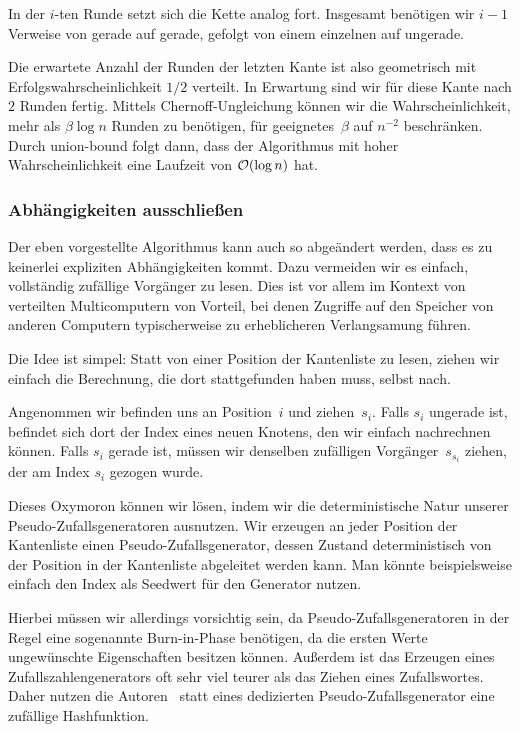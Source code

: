In der $i$-ten Runde setzt sich die Kette analog fort.
Insgesamt benötigen wir $i-1$ Verweise von gerade auf gerade, gefolgt von einem einzelnen auf ungerade.

Die erwartete Anzahl der Runden der letzten Kante ist also geometrisch mit Erfolgswahrscheinlichkeit $1/2$ verteilt.
In Erwartung sind wir für diese Kante nach $2$ Runden fertig.
Mittels Chernoff-Ungleichung können wir die Wahrscheinlichkeit, mehr als $\beta \log n$ Runden zu benötigen, für geeignetes~$\beta$ auf $n^{-2}$ beschränken.
Durch union-bound folgt dann, dass der Algorithmus mit hoher Wahrscheinlichkeit eine Laufzeit von $\mathcal{O}\!\left(\log n\right)$ hat.

\subsubsection{Abhängigkeiten ausschließen}
Der eben vorgestellte Algorithmus kann auch so abgeändert werden, dass es zu keinerlei expliziten Abhängigkeiten kommt.
Dazu vermeiden wir es einfach, vollständig zufällige Vorgänger zu lesen.
Dies ist vor allem im Kontext von verteilten Multicomputern von Vorteil, bei denen Zugriffe auf den Speicher von anderen Computern typischerweise zu erheblicheren Verlangsamung führen.

Die Idee ist simpel: Statt von einer Position der Kantenliste zu lesen, ziehen wir einfach die Berechnung, die dort stattgefunden haben muss, selbst nach.

Angenommen wir befinden uns an Position~$i$ und ziehen~$s_i$.
Falls $s_i$ ungerade ist, befindet sich dort der Index eines neuen Knotens, den wir einfach nachrechnen können.
Falls $s_i$ gerade ist, müssen wir  denselben zufälligen Vorgänger~$s_{s_i}$ ziehen, der am Index $s_i$ gezogen wurde.

Dieses Oxymoron können wir lösen, indem wir die deterministische Natur unserer Pseudo-Zufallsgeneratoren ausnutzen.
Wir erzeugen an jeder Position der Kantenliste einen Pseudo-Zufallsgenerator, dessen Zustand deterministisch von der Position in der Kantenliste abgeleitet werden kann.
Man könnte beispielsweise einfach den Index als Seedwert für den Generator nutzen.

Hierbei müssen wir allerdings vorsichtig sein, da Pseudo-Zufallsgeneratoren in der Regel eine sogenannte Burn-in-Phase benötigen, da die ersten Werte ungewünschte Eigenschaften besitzen können.
Außerdem ist das Erzeugen eines Zufallszahlengenerators oft sehr viel teurer als das Ziehen eines Zufallswortes.
Daher nutzen die Autoren~\cite{SANDERS2016489} statt eines dedizierten Pseudo-Zufallsgenerator eine zufällige Hashfunktion.

